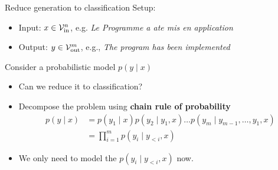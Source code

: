 \documentclass[usenames,dvipsnames,notes,11pt,aspectratio=169,hyperref={colorlinks=true, linkcolor=blue}]{beamer}
\begin{document}
\begin{frame}
    {Reduce generation to classification}
    Setup:\\
    \begin{itemize}
        \item Input: $x \in \mathcal{V}_{\text{in}}^n$, e.g. \textit{Le Programme    a    ate    mis    en application}
        \item Output: $y \in \mathcal{V}_{\text{out}}^m$, e.g., \textit{The program has been implemented }
    \end{itemize}
    \pause

    Consider a probabilistic model $p(y\mid x)$\\
    \begin{itemize}[<+->]
        \item Can we reduce it to classification?
        \item Decompose the problem using \textbf{chain rule of probability} 
            \begin{align*}
                p(y\mid x) &= p(y_1\mid x)p(y_2\mid y_1, x)\ldots p(y_m\mid y_{m-1},\ldots,y_1, x) \\
                &= \prod_{i=1}^m p(y_i\mid y_{<i}, x)
            \end{align*}
        \item We only need to model the  $p(y_i\mid y_{<i}, x)$ now.
    \end{itemize}
\end{frame}
\end{document}
